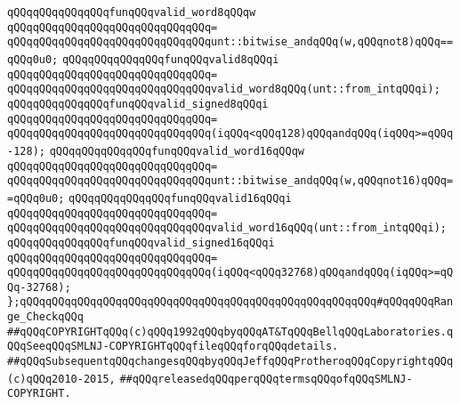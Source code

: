 \newline
\verb|qQQqqQQqqQQqqQQqfunqQQqvalid_word8qQQqw|\newline
\verb|qQQqqQQqqQQqqQQqqQQqqQQqqQQqqQQq=|\newline
\verb|qQQqqQQqqQQqqQQqqQQqqQQqqQQqqQQqunt::bitwise_andqQQq(w,qQQqnot8)qQQq==qQQq0u0;|\newline
\newline
\verb|qQQqqQQqqQQqqQQqfunqQQqvalid8qQQqi|\newline
\verb|qQQqqQQqqQQqqQQqqQQqqQQqqQQqqQQq=|\newline
\verb|qQQqqQQqqQQqqQQqqQQqqQQqqQQqqQQqvalid_word8qQQq(unt::from_intqQQqi);|\newline
\newline
\verb|qQQqqQQqqQQqqQQqfunqQQqvalid_signed8qQQqi|\newline
\verb|qQQqqQQqqQQqqQQqqQQqqQQqqQQqqQQq=|\newline
\verb|qQQqqQQqqQQqqQQqqQQqqQQqqQQqqQQq(iqQQq<qQQq128)qQQqandqQQq(iqQQq>=qQQq-128);|\newline
\newline
\verb|qQQqqQQqqQQqqQQqfunqQQqvalid_word16qQQqw|\newline
\verb|qQQqqQQqqQQqqQQqqQQqqQQqqQQqqQQq=|\newline
\verb|qQQqqQQqqQQqqQQqqQQqqQQqqQQqqQQqunt::bitwise_andqQQq(w,qQQqnot16)qQQq==qQQq0u0;|\newline
\newline
\verb|qQQqqQQqqQQqqQQqfunqQQqvalid16qQQqi|\newline
\verb|qQQqqQQqqQQqqQQqqQQqqQQqqQQqqQQq=|\newline
\verb|qQQqqQQqqQQqqQQqqQQqqQQqqQQqqQQqvalid_word16qQQq(unt::from_intqQQqi);|\newline
\newline
\verb|qQQqqQQqqQQqqQQqfunqQQqvalid_signed16qQQqi|\newline
\verb|qQQqqQQqqQQqqQQqqQQqqQQqqQQqqQQq=|\newline
\verb|qQQqqQQqqQQqqQQqqQQqqQQqqQQqqQQq(iqQQq<qQQq32768)qQQqandqQQq(iqQQq>=qQQq-32768);|\newline
\newline
\verb|};qQQqqQQqqQQqqQQqqQQqqQQqqQQqqQQqqQQqqQQqqQQqqQQqqQQqqQQq#qQQqqQQqRange_CheckqQQq|\newline
\newline
\newline
\verb|##qQQqCOPYRIGHTqQQq(c)qQQq1992qQQqbyqQQqAT&TqQQqBellqQQqLaboratories.qQQqSeeqQQqSMLNJ-COPYRIGHTqQQqfileqQQqforqQQqdetails.|\newline
\verb|##qQQqSubsequentqQQqchangesqQQqbyqQQqJeffqQQqProtheroqQQqCopyrightqQQq(c)qQQq2010-2015,|\newline
\verb|##qQQqreleasedqQQqperqQQqtermsqQQqofqQQqSMLNJ-COPYRIGHT.|\newline

